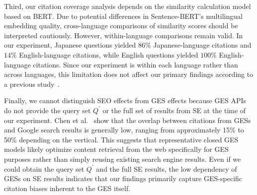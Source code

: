 Third, our citation coverage analysis depends on the similarity calculation model based on BERT.
Due to potential differences in Sentence-BERT's multilingual embedding quality, cross-language comparisons of similarity scores should be interpreted cautiously.
However, within-language comparisons remain valid.
In our experiment, Japanese questions yielded \( 86\% \) Japanese-language citations and \( 14\% \) English-language citations, while English questions yielded \( 100\% \) English-language citations.
Since our experiment is within each language rather than across languages, this limitation does not affect our primary findings according to a previous study~\cite{cer-etal-2017-semeval}.

Finally, we cannot distinguish SEO effects from GES effects because GES APIs do not provide the query set \( Q^{\prime} \) or the full set of results from SE at the time of our experiment.
Chen et al.~\cite{chen2025geo} show that the overlap between citations from GESs and Google search results is generally low, ranging from approximately 15\% to 50\% depending on the vertical.
This suggests that representative closed GES models likely optimize content retrieval from the web specifically for GES purposes rather than simply reusing existing search engine results.
Even if we could obtain the query set \( Q^{\prime} \) and the full SE results, the low dependency of GESs on SE results indicates that our findings primarily capture GES-specific citation biases inherent to the GES itself.
